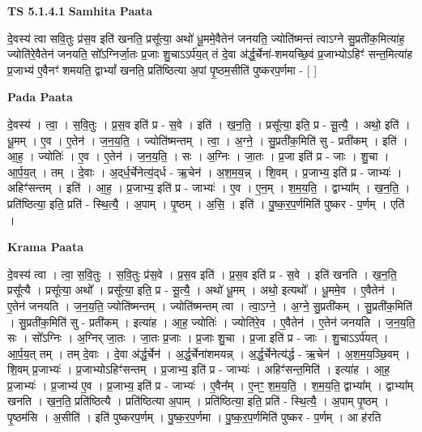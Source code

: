 \documentclass[17pt]{extarticle}
\begin{document}
\textbf{TS 5.1.4.1 } \newline
\textbf{Samhita Paata} \newline

दे॒वस्य॑ त्वा सवि॒तुः प्र॑स॒व इति॑ खनति॒ प्रसू᳚त्या॒ अथो॑ धू॒ममे॒वैतेन॑ जनयति॒ ज्योति॑ष्मन्तं त्वाऽग्ने सु॒प्रती॑क॒मित्या॑ह॒ ज्योति॑रे॒वैतेन॑ जनयति॒ सो᳚ऽग्निर्जा॒तः प्र॒जाः शु॒चाऽऽर्प॑य॒त् तं दे॒वा अ॑र्द्ध॒र्चेना॑-शमयच्छि॒वं प्र॒जाभ्योऽहिꣳ॑ सन्त॒मित्या॑ह प्र॒जाभ्य॑ ए॒वैनꣳ॑ शमयति॒ द्वाभ्यां᳚ खनति॒ प्रति॑ष्ठित्या अ॒पां पृ॒ष्ठम॒सीति॑ पुष्करप॒र्णमा - [  ] \newline

\textbf{Pada Paata} \newline

दे॒वस्य॑ । त्वा॒ । स॒वि॒तुः । प्र॒स॒व इति॑ प्र - स॒वे । इति॑ । ख॒न॒ति॒ । प्रसू᳚त्या॒ इति॒ प्र - सू॒त्यै॒ । अथो॒ इति॑ । धू॒मम् । ए॒व । ए॒तेन॑ । ज॒न॒य॒ति॒ । ज्योति॑ष्मन्तम् । त्वा॒ । अ॒ग्ने॒ । सु॒प्रती॑क॒मिति॑ सु - प्रती॑कम् । इति॑ । आ॒ह॒ । ज्योतिः॑ । ए॒व । ए॒तेन॑ । ज॒न॒य॒ति॒ । सः । अ॒ग्निः । जा॒तः । प्र॒जा इति॑ प्र - जाः । शु॒चा । आ॒र्प॒य॒त् । तम् । दे॒वाः । अ॒द्‌र्ध॒र्चेनेत्य॒॑द्‌र्ध - ऋ॒चेन॑ । अ॒श॒म॒य॒न्न् । शि॒वम् । प्र॒जाभ्य॒ इति॑ प्र - जाभ्यः॑ । अहिꣳ॑सन्तम् । इति॑ । आ॒ह॒ । प्र॒जाभ्य॒ इति॑ प्र - जाभ्यः॑ । ए॒व । ए॒न॒म् । श॒म॒य॒ति॒ । द्वाभ्या᳚म् । ख॒न॒ति॒ । प्रति॑ष्ठित्या॒ इति॒ प्रति॑ - स्थि॒त्यै॒ । अ॒पाम् । पृ॒ष्ठम् । अ॒सि॒ । इति॑ । पु॒ष्क॒र॒प॒र्णमिति॑ पुष्कर - प॒र्णम् । एति॑ ।  \newline


\textbf{Krama Paata} \newline

दे॒वस्य॑ त्वा । त्वा॒ स॒वि॒तुः । स॒वि॒तुः प्र॑स॒वे । प्र॒स॒व इति॑ । प्र॒स॒व इति॑ प्र - स॒वे । इति॑ खनति । ख॒न॒ति॒ प्रसू᳚त्यै । प्रसू᳚त्या॒ अथो᳚ । प्रसू᳚त्या॒ इति॒ प्र - सू॒त्यै॒ । अथो॑ धू॒मम् । अथो॒ इत्यथो᳚ । धू॒ममे॒व । ए॒वैतेन॑ । ए॒तेन॑ जनयति । ज॒न॒य॒ति॒ ज्योति॑ष्मन्तम् । ज्योति॑ष्मन्तम् त्वा । त्वा॒ऽग्ने॒ । अ॒ग्ने॒ सु॒प्रती॑कम् । सु॒प्रती॑क॒मिति॑ । सु॒प्रती॑क॒मिति॑ सु - प्रती॑कम् । इत्या॑ह । आ॒ह॒ ज्योतिः॑ । ज्योति॑रे॒व । ए॒वैतेन॑ । ए॒तेन॑ जनयति । ज॒न॒य॒ति॒ सः । सो᳚ऽग्निः । अ॒ग्निर् जा॒तः । जा॒तः प्र॒जाः । प्र॒जाः शु॒चा । प्र॒जा इति॑ प्र - जाः । शु॒चाऽऽर्प॑यत् । आ॒र्प॒य॒त् तम् । तम् दे॒वाः । दे॒वा अ॑र्द्ध॒र्चेन॑ । अ॒र्द्ध॒र्चेना॑शमयन्न् । अ॒र्द्ध॒र्चेनेत्य॑र्द्ध - ऋ॒चेन॑ । अ॒श॒म॒य॒ञ्छि॒वम् । शि॒वम् प्र॒जाभ्यः॑ । प्र॒जाभ्योऽहिꣳ॑सन्तम् । प्र॒जाभ्य॒ इति॑ प्र - जाभ्यः॑ । अहिꣳ॑सन्त॒मिति॑ । इत्या॑ह । आ॒ह॒ प्र॒जाभ्यः॑ । प्र॒जाभ्य॑ ए॒व । प्र॒जाभ्य॒ इति॑ प्र - जाभ्यः॑ । ए॒वैन᳚म् । ए॒नꣳ॒॒ श॒म॒य॒ति॒ । श॒म॒य॒ति॒ द्वाभ्या᳚म् । द्वाभ्या᳚म् खनति । ख॒न॒ति॒ प्रति॑ष्ठित्यै । प्रति॑ष्ठित्या अ॒पाम् । प्रति॑ष्ठित्या॒ इति॒ प्रति॑ - स्थि॒त्यै॒ । अ॒पाम् पृ॒ष्ठम् । पृ॒ष्ठम॑सि । अ॒सीति॑ । इति॑ पुष्करप॒र्णम् । पु॒ष्क॒र॒प॒र्णमा । पु॒ष्क॒र॒प॒र्णमिति॑ पुष्कर - प॒र्णम् । आ ह॑रति \newline
\end{document}
